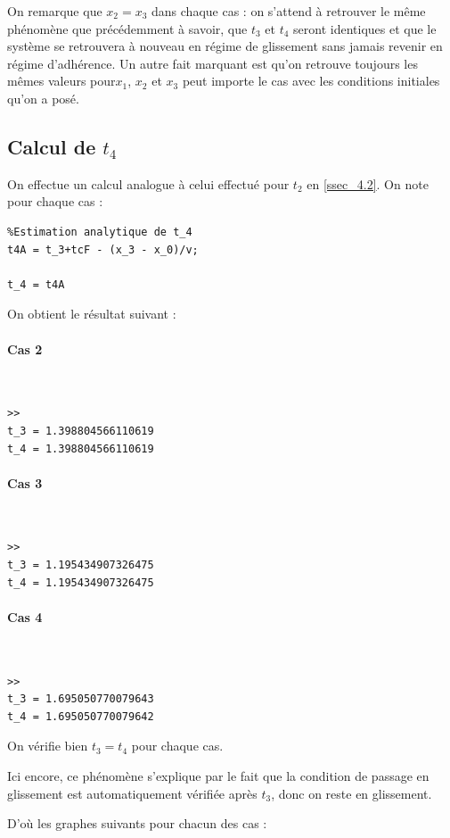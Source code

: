 \documentclass{article}
\begin{document}
On remarque que $x_2=x_3$ dans chaque cas : on s'attend à retrouver le même phénomène que précédemment à savoir, que $t_3$ et $t_4$ seront identiques et que le système se retrouvera à nouveau en régime de glissement sans jamais revenir en régime d'adhérence. Un autre fait marquant est qu'on retrouve toujours les mêmes valeurs pour$x_1$, $x_2$ et $x_3$ peut importe le cas avec les conditions initiales qu'on a posé. 

\subsection{Calcul de $t_4$}
On effectue un calcul analogue à celui effectué pour $t_2$ en \ref{ssec_4.2}. On note pour chaque cas :

\begin{lstlisting}
%Estimation analytique de t_4 
t4A = t_3+tcF - (x_3 - x_0)/v;

t_4 = t4A
\end{lstlisting}

On obtient le résultat suivant :

\paragraph{Cas 2}
$ $
\begin{lstlisting}
>>
t_3 = 1.398804566110619
t_4 = 1.398804566110619
\end{lstlisting}

\paragraph{Cas 3}
$ $
\begin{lstlisting}
>>
t_3 = 1.195434907326475
t_4 = 1.195434907326475
\end{lstlisting}

\paragraph{Cas 4}
$ $
\begin{lstlisting}
>>
t_3 = 1.695050770079643
t_4 = 1.695050770079642
\end{lstlisting}


On vérifie bien $t_3=t_4$ pour chaque cas. 

Ici encore, ce phénomène s'explique par le fait que la condition de passage en glissement est automatiquement vérifiée après $t_3$, donc on reste en glissement. 

D'où les graphes suivants  pour chacun des cas :
\end{document}
